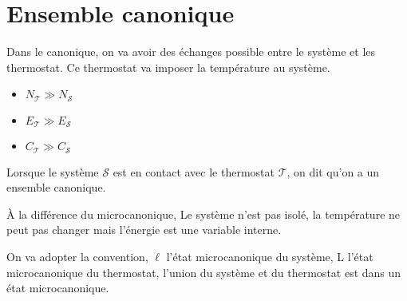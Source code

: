 \documentclass[12pt,a4paper]{report}
\begin{document}
\chapter{Ensemble canonique}

Dans le canonique, on va avoir des échanges possible entre le système et les thermostat. Ce thermostat va imposer la température au système.

\begin{itemize}
	\item $N_\mathcal{T} \gg N_\mathcal{S}$
	\item $E_\mathcal{T} \gg E_\mathcal{S}$
	\item $C_\mathcal{T} \gg C_\mathcal{S}$ 
\end{itemize}

Lorsque le système $\mathcal{S}$ est en contact avec le thermostat $\mathcal{T}$, on dit qu'on a un ensemble canonique.

À la différence du microcanonique, Le système n'est pas isolé, la température ne peut pas changer mais l'énergie est une variable interne.

On va adopter la convention, $\ell$ l'état microcanonique du système, L l'état microcanonique du thermostat, l'union du système et du thermostat est dans un état microcanonique.
\end{document}
